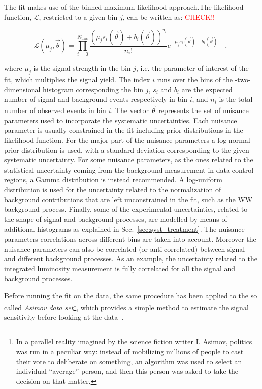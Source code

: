 The fit makes use of the binned maximum likelihood approach.The likelihood function, $\mathcal{L}$, restricted to a given \pth bin $j$, can be written as: \textcolor{red}{CHECK!!}

\begin{equation}
\mathcal{L}(\mu_j,\vec{\theta}) = \prod_{i=0}^{N_\mathrm{bins}} \frac{(\mu_j s_i(\vec{\theta}) + b_i(\vec{\theta}))^{n_i}}{n_i!}e^{-\mu_j s_i(\vec{\theta}) - b_i(\vec{\theta})} \quad ,
\end{equation}

where $\mu_j$ is the signal strength in the bin $j$, i.e. the parameter of interest of the fit, which multiplies the signal yield. The index $i$ runs over the bins of the \mll-\mt two-dimensional histogram corresponding the \pth bin $j$, $s_i$ and $b_i$ are the expected number of signal and background events respectively in bin $i$, and $n_i$ is the total number of observed events in bin $i$. The vector $\vec{\theta}$ represents the set of nuisance parameters used to incorporate the systematic uncertainties. Each nuisance parameter is usually constrained in the fit including prior distributions in the likelihood function. For the major part of the nuisance parameters a log-normal prior distribution is used, with a standard deviation corresponding to the given systematic uncertainty. For some nuisance parameters, as the ones related to the statistical uncertainty coming from the background measurement in data control regions, a Gamma distribution is instead recommended. A log-uniform distribution is used for the uncertainty related to the normalization of background contributions that are left unconstrained in the fit, such as the WW background process.
Finally, some of the experimental uncertainties, related to the shape of signal and background processes, are modelled by means of additional histograms as explained in Sec.~\ref{sec:syst_treatment}. The nuisance parameters correlations across different \pth bins are taken into account. Moreover the nuisance parameters can also be correlated (or anti-correlated) between signal and different background processes. As an example, the uncertainty related to the integrated luminosity measurement is fully correlated for all the signal and background processes.

Before running the fit on the data, the same procedure has been applied to the so called \textit{Asimov data set}\footnote{In a parallel reality imagined by the science fiction writer I. Asimov, politics was run in a peculiar way: instead of mobilizing millions of people to cast their vote to deliberate on something, an algorithm was used to select an individual ``average'' person, and then this person was asked to take the decision on that matter.}, which provides a simple method to estimate the signal sensitivity before looking at the data~\cite{Cowan:2010js}.



